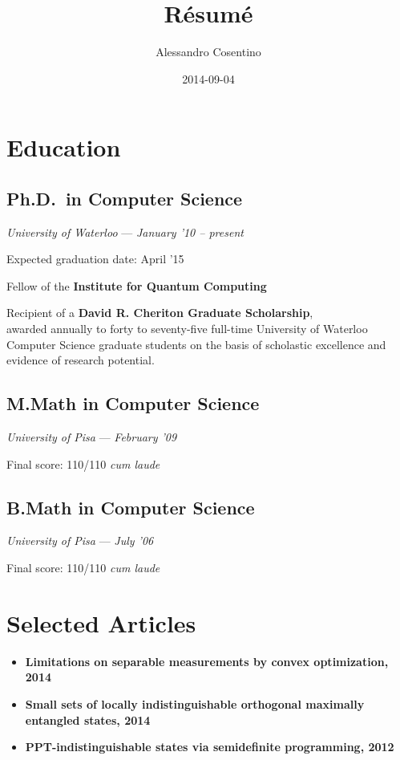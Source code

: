 \documentclass[]{article}
\title{Résumé}
\author{Alessandro Cosentino}
\date{2014-09-04}
\begin{document}
\maketitle

\section{Education}\label{education}

\subsection{Ph.D.~in Computer Science}\label{ph.d.in-computer-science}

\emph{University of Waterloo} --- \emph{January '10 -- present}

Expected graduation date: April '15

Fellow of the \textbf{Institute for Quantum Computing}

Recipient of a \textbf{David R. Cheriton Graduate Scholarship},\\awarded
annually to forty to seventy-five full-time University of Waterloo
Computer Science graduate students on the basis of scholastic excellence
and evidence of research potential.

\subsection{M.Math in Computer
Science}\label{m.math-in-computer-science}

\emph{University of Pisa} --- \emph{February '09}

Final score: 110/110 \emph{cum laude}

\subsection{B.Math in Computer
Science}\label{b.math-in-computer-science}

\emph{University of Pisa} --- \emph{July '06}

Final score: 110/110 \emph{cum laude}

\section{Selected Articles}\label{selected-articles}

\begin{itemize}
\itemsep1pt\parskip0pt
\item
  \textbf{Limitations on separable measurements by convex optimization,
  2014}
\item
  \textbf{Small sets of locally indistinguishable orthogonal maximally
  entangled states, 2014}
\item
  \textbf{PPT-indistinguishable states via semidefinite programming,
  2012}
\end{itemize}
\end{document}

